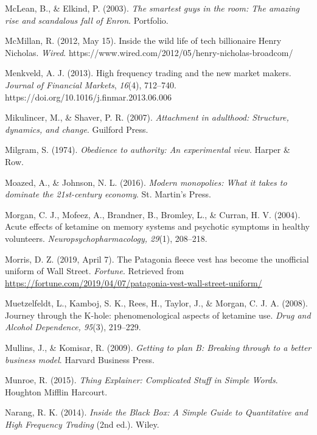 \begin{thebibliography}{}
    McLean, B., \& Elkind, P. (2003). \textit{The smartest guys in the room: The amazing rise and scandalous fall of Enron}. Portfolio.

    McMillan, R. (2012, May 15). Inside the wild life of tech billionaire Henry Nicholas. \textit{Wired}. https://www.wired.com/2012/05/henry-nicholas-broadcom/

    Menkveld, A. J. (2013). High frequency trading and the new market makers. \textit{Journal of Financial Markets}, \textit{16}(4), 712–740. https://doi.org/10.1016/j.finmar.2013.06.006

    Mikulincer, M., \& Shaver, P. R. (2007). \textit{Attachment in adulthood: Structure, dynamics, and change}. Guilford Press.

    Milgram, S. (1974). \textit{Obedience to authority: An experimental view}. Harper \& Row.

    Moazed, A., \& Johnson, N. L. (2016). \textit{Modern monopolies: What it takes to dominate the 21st-century economy}. St. Martin’s Press.

    Morgan, C. J., Mofeez, A., Brandner, B., Bromley, L., \& Curran, H. V. (2004). Acute effects of ketamine on memory systems and psychotic symptoms in healthy volunteers. \textit{Neuropsychopharmacology, 29}(1), 208–218.

    Morris, D. Z. (2019, April 7). The Patagonia fleece vest has become the unofficial uniform of Wall Street. \textit{Fortune}. Retrieved from \url{https://fortune.com/2019/04/07/patagonia-vest-wall-street-uniform/}

    Muetzelfeldt, L., Kamboj, S. K., Rees, H., Taylor, J., \& Morgan, C. J. A. (2008). Journey through the K-hole: phenomenological aspects of ketamine use. \textit{Drug and Alcohol Dependence, 95}(3), 219–229.

    Mullins, J., \& Komisar, R. (2009). \textit{Getting to plan B: Breaking through to a better business model}. Harvard Business Press.

    Munroe, R. (2015). \textit{Thing Explainer: Complicated Stuff in Simple Words}. Houghton Mifflin Harcourt.


    Narang, R. K. (2014). \textit{Inside the Black Box: A Simple Guide to Quantitative and High Frequency Trading} (2nd ed.). Wiley.


\end{thebibliography}
